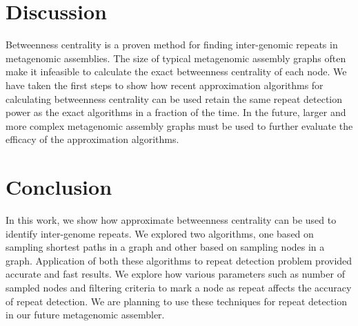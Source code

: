 \documentclass[runningheads,a4paper]{llncs}
\begin{document}
\section{Discussion}
Betweenness centrality is a proven method for finding inter-genomic repeats in metagenomic assemblies.
The size of typical metagenomic assembly graphs often make it infeasible to calculate the exact betweenness centrality of each node.
We have taken the first steps to show how recent approximation algorithms for calculating betweenness centrality can be used retain the same repeat detection power as the exact algorithms in a fraction of the time.
In the future, larger and more complex metagenomic assembly graphs must be used to further evaluate the efficacy of the approximation algorithms.

\section{Conclusion}
In this work, we show how approximate betweenness centrality can be used to identify inter-genome repeats. We explored two algorithms, one based on sampling shortest paths in a graph and other based on sampling nodes in a graph. Application of both these algorithms to repeat detection problem provided accurate and fast results. We explore how various parameters such as number of sampled nodes and filtering criteria to mark a node as repeat affects the accuracy of repeat detection. We are planning to use these techniques for repeat detection in our future metagenomic assembler. 
{}

\end{document}
